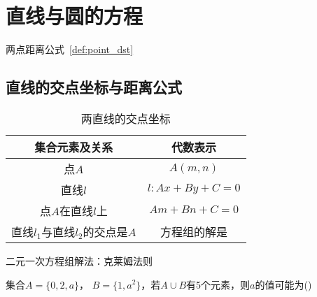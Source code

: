 \chapter{直线与圆的方程}
\label{ch:直线与圆的方程}

\begin{introduction}
  \item 两点距离公式~\ref{def:point_dst}
\end{introduction}


\section{直线的交点坐标与距离公式}

\begin{table}[htbp]
  \caption{两直线的交点坐标\label{tab:color thm}}
  \centering
  \begin{tabular}{cc}
  \toprule
              集合元素及关系
              & 代数表示\\
  \midrule
              点$A$
              & $A(m, n)$ \\
              直线$l$
              & $l: Ax+By+C=0$ \\
              点$A$在直线$l$上
              & $Am+Bn+C=0$\\
              直线$l_1$与直线$l_2$的交点是$A$
              & 方程组的解是\\
  \bottomrule
  \end{tabular}
\end{table}

\begin{note}
    二元一次方程组解法：克莱姆法则

    
\end{note}




\newpage
\begin{problemset}
	\item 集合$A=\{0,2,a\}$， $B=\{1, a^2\}$，若$A \cup B$有5个元素，则$a$的值可能为(\hspace{1cm})
\end{problemset}